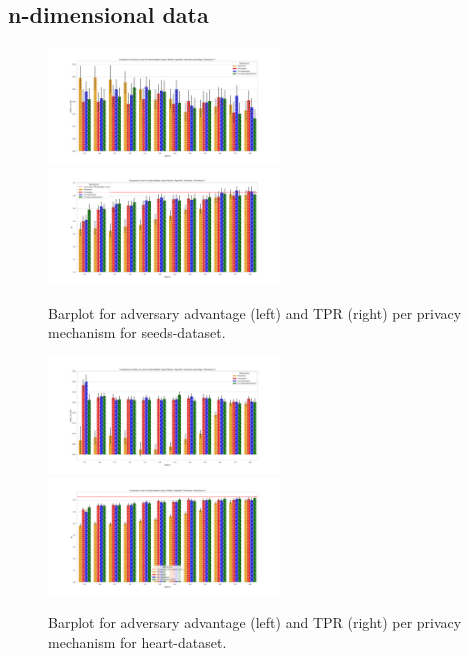 \subsection{n-dimensional data}
\begin{figure}[H]
    \centering
    \begin{minipage}[c]{1.1\textwidth}
        \includegraphics[width=0.55\textwidth]{Results/RQ2-nd/seeds-dataset/shokri_mi_adv_seeds-dataset_comparison.png}
        \includegraphics[width=0.55\textwidth]{Results/RQ2-nd/seeds-dataset/tpr_seeds-dataset_comparison.png}
        \caption{Barplot for adversary advantage (left) and TPR (right) per privacy mechanism for seeds-dataset.}
        \label{fig:privacy_seeds-dataset_comparison_nd_aa_plot}
    \end{minipage}
    \begin{minipage}[c]{1.1\textwidth}
        \includegraphics[width=0.55\textwidth]{Results/RQ2-nd/heart-dataset/shokri_mi_adv_heart-dataset_comparison.png}
        \includegraphics[width=0.55\textwidth]{Results/RQ2-nd/heart-dataset/tpr_heart-dataset_comparison.png}
        \caption{Barplot for adversary advantage (left) and TPR (right) per privacy mechanism for heart-dataset.}
        \label{fig:privacy_heart-dataset_comparison_nd_aa_plot}
    \end{minipage}
\end{figure}

